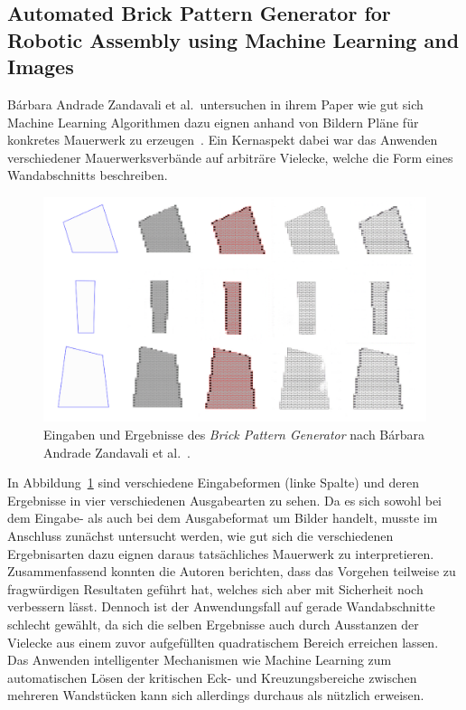 \subsection{Automated Brick Pattern Generator for Robotic Assembly using Machine Learning and Images}
Bárbara Andrade Zandavali et al.\ untersuchen in ihrem Paper wie gut sich Machine Learning Algorithmen dazu eignen anhand von Bildern Pläne für konkretes Mauerwerk zu erzeugen~\cite{Zandavali2019}.
Ein Kernaspekt dabei war das Anwenden verschiedener Mauerwerksverbände auf arbiträre Vielecke, welche die Form eines Wandabschnitts beschreiben.
\begin{figure}[ht!]
    \centering
    \includegraphics[width=0.8\columnwidth]{fig/ecaadesigradi2019_605.png}
    \caption{Eingaben und Ergebnisse des \textit{Brick Pattern Generator} nach Bárbara Andrade Zandavali et al.~\cite{Zandavali2019}.}\label{fig:related:Zandavali2019}
\end{figure}
In Abbildung~\ref{fig:related:Zandavali2019} sind verschiedene Eingabeformen (linke Spalte) und deren Ergebnisse in vier verschiedenen Ausgabearten zu sehen.
Da es sich sowohl bei dem Eingabe- als auch bei dem Ausgabeformat um Bilder handelt, musste im Anschluss zunächst untersucht werden, wie gut sich die verschiedenen Ergebnisarten dazu eignen daraus tatsächliches Mauerwerk zu interpretieren.
Zusammenfassend konnten die Autoren berichten, dass das Vorgehen teilweise zu fragwürdigen Resultaten geführt hat, welches sich aber mit Sicherheit noch verbessern lässt.
Dennoch ist der Anwendungsfall auf gerade Wandabschnitte schlecht gewählt, da sich die selben Ergebnisse auch durch \glqq{}Ausstanzen\grqq{} der Vielecke aus einem zuvor aufgefüllten quadratischem Bereich erreichen lassen.
Das Anwenden intelligenter Mechanismen wie Machine Learning zum automatischen Lösen der kritischen Eck- und Kreuzungsbereiche zwischen mehreren Wandstücken kann sich allerdings durchaus als nützlich erweisen.

